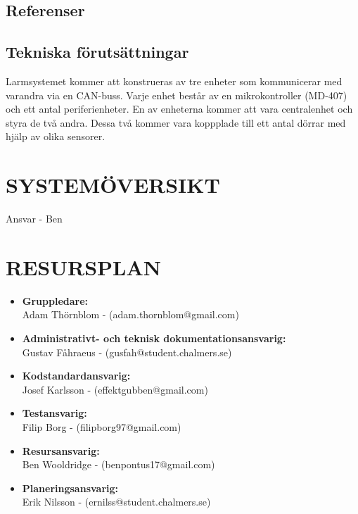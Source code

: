 \documentclass[a4paper]{article}
\begin{document}
\subsection{Referenser}
\label{sec:referenser}



\subsection{Tekniska förutsättningar}
\label{sec:tekniskaf}
Larmsystemet kommer att konstrueras av tre enheter som kommunicerar med varandra via en CAN-buss. Varje enhet består av en mikrokontroller (MD-407) och ett antal periferienheter. En av enheterna kommer att vara centralenhet och styra de två andra. Dessa två kommer vara koppplade till ett antal dörrar med hjälp av olika sensorer.



\section{SYSTEMÖVERSIKT}
\label{sec:systemö}

Ansvar - Ben

\section{RESURSPLAN}
\label{sec:resurs}

\begin{itemize}
    \item \textbf{Gruppledare:}
    \\
    Adam Thörnblom - (adam.thornblom@gmail.com)
    
    \item \textbf{Administrativt- och teknisk dokumentationsansvarig:} 
    \\
    Gustav Fåhraeus - (gusfah@student.chalmers.se)

    \item \textbf{Kodstandardansvarig:}
    \\
    Josef Karlsson - (effektgubben@gmail.com)

    \item \textbf{Testansvarig:}
    \\
    Filip Borg - (filipborg97@gmail.com) 

    \item \textbf{Resursansvarig:} 
    \\
    Ben Wooldridge - (benpontus17@gmail.com)

    \item \textbf{Planeringsansvarig:}
    \\
    Erik Nilsson - (ernilss@student.chalmers.se) 
\end{itemize}
\end{document}
